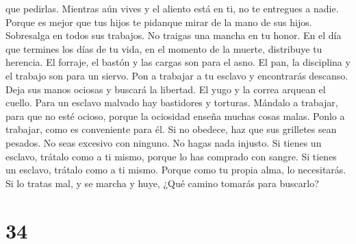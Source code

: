 que pedirlas.  Mientras aún vives y el aliento está en
ti, no te entregues a nadie.  Porque es mejor que tus
hijos te pidanque mirar de la mano de sus hijos. 
Sobresalga en todos sus trabajos. No traigas una mancha en tu honor.
 En el día que termines los días de tu vida, en el
momento de la muerte, distribuye tu herencia.  El
forraje, el bastón y las cargas son para el asno. El pan, la disciplina
y el trabajo son para un siervo.  Pon a trabajar a tu
esclavo y encontrarás descanso. Deja sus manos ociosas y buscará la
libertad.  El yugo y la correa arquean el cuello. Para un
esclavo malvado hay bastidores y torturas.  Mándalo a
trabajar, para que no esté ocioso, porque la ociosidad enseña muchas
cosas malas.  Ponlo a trabajar, como es conveniente para
él. Si no obedece, haz que sus grilletes sean pesados. 
No seas excesivo con ninguno. No hagas nada injusto.  Si
tienes un esclavo, trátalo como a ti mismo, porque lo has comprado con
sangre.  Si tienes un esclavo, trátalo como a ti mismo.
Porque como tu propia alma, lo necesitarás. Si lo tratas mal, y se
marcha y huye,  ¿Qué camino tomarás para buscarlo?

\hypertarget{section-33}{%
\section{34}\label{section-33}}

